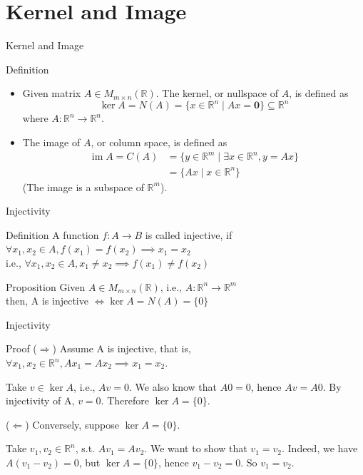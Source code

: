 \documentclass[aspectratio=169]{beamer}
\begin{document}
\section{Kernel and Image}
\begin{frame}{Kernel and Image}
    \begin{block}{Definition}
        \begin{itemize}
    \item Given matrix $A \in M_{m \times n}(\mathbb{R})$. The kernel, or nullspace of $A$, is defined as
    \[
    \operatorname{ker} A = N(A) = \{x \in \mathbb{R}^n \mid Ax = \mathbf{0}\} \subseteq \mathbb{R}^n
    \]
    where $A: \mathbb{R}^n \rightarrow \mathbb{R}^n$.

    \item The image of $A$, or column space, is defined as
    \begin{align*}
    \operatorname{im} A = C(A) &= \{y \in \mathbb{R}^m \mid \exists x \in \mathbb{R}^n, y = Ax\} \\
    &= \{Ax \mid x \in \mathbb{R}^n\}
    \end{align*}
    (The image is a subspace of $\mathbb{R}^m$).
\end{itemize}
    \end{block}
\end{frame}

\begin{frame}{Injectivity}
    \begin{block}{Definition}
        A function $f: A \to B$ is called injective, if \\
        $\forall x_1, x_2 \in A, f(x_1) = f(x_2) \implies x_1 = x_2$ \\
        i.e., $\forall x_1, x_2 \in A, x_1 \neq x_2 \implies f(x_1) \neq f(x_2)$
    \end{block}
    \begin{block}{Proposition}
        Given $A \in M_{m \times n}(\mathbb{R})$, i.e., $A: \mathbb{R}^n \to \mathbb{R}^m$ \\
        then, A is injective $\iff \ker A = N(A) = \{0\}$
    \end{block}
\end{frame}

\begin{frame}{Injectivity}
    \begin{block}{Proof}
        ($\Rightarrow$) Assume A is injective, that is, \\
$\forall x_1, x_2 \in \mathbb{R}^n, Ax_1 = Ax_2 \implies x_1 = x_2$.

Take $v \in \ker A$, i.e., $Av = 0$.
We also know that $A0 = 0$, hence $Av = A0$.
By injectivity of A, $v=0$. Therefore $\ker A = \{0\}$.

($\Leftarrow$) Conversely, suppose $\ker A = \{0\}$.

Take $v_1, v_2 \in \mathbb{R}^n$, s.t. $Av_1 = Av_2$.
We want to show that $v_1 = v_2$.
Indeed, we have $A(v_1 - v_2) = 0$, but $\ker A = \{0\}$,
hence $v_1 - v_2 = 0$. So $v_1 = v_2$.
    \end{block}
\end{frame}
\end{document}
